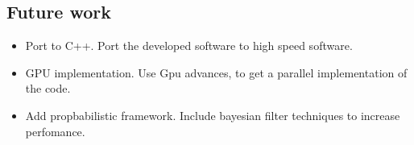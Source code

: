 \documentclass[12pt, a4paper, titlepage,twoside,openright]{article}
\begin{document}
\subsection{Future work}


\begin{itemize}

\item Port to C++. Port the developed software to high speed software.
\item GPU implementation. Use Gpu advances, to get a parallel implementation of the code.

\item Add propbabilistic framework. Include bayesian filter techniques to increase perfomance.


\end{itemize}

{}

\end{document}
